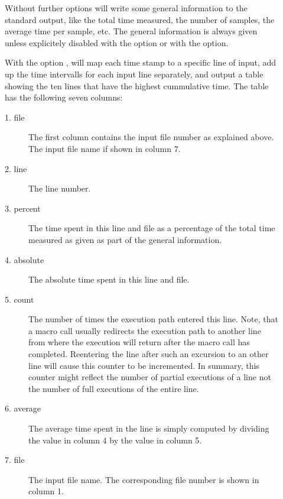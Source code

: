 \documentclass[a4paper,english]{article}
\begin{document}
\begin{description}
\item[ ]
  Without further options  will write some general
  information to the standard output, like the total time measured,
  the number of samples, the average time per sample, etc.
  The general information is always given unless explicitely disabled
  with the  option or with the  option.

\item[  ]
  With the option ,  will map each time stamp
  to a specific line of input, add up the time intervalls for each input
  line separately, and output a table showing the ten lines that have
  the highest cummulative time.
  The table has the following seven columns:
  \begin{description}
  \item[1. file]
    The first column contains the input file number as explained above.
    The input file name if shown in column 7.

  \item[2. line]
    The line number.
  \item[3. percent]
    The time spent in this line and file as a percentage of the total
    time measured as given as part of the general information.
  \item[4. absolute]
    The absolute time spent in this line and file.
  \item[5. count]
    The number of times the execution path entered this line.
    Note, that a
    macro call usually redirects the execution path to another line
    from where the execution will return after the macro call has completed.
    Reentering the line after such an excursion to an other line will
    cause this counter to be incremented. In summary, this counter might
    reflect the number of partial executions of a line not the number
    of full executions of the entire line.
  \item[6. average]
    The average time spent in the line is simply computed by dividing the
    value in column 4 by the value in column 5.
  \item[7. file]
    The input file name. The corresponding file number is shown in column 1.
  \end{description}


\end{description}
\end{document}
